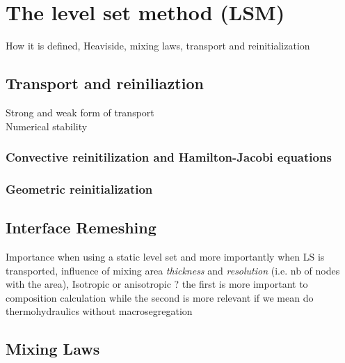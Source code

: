 \section{The level set method (LSM)}
How it is defined, Heaviside, mixing laws, transport and reinitialization

\subsection{Transport and reiniliaztion}
Strong and weak form of transport \\
Numerical stability \\
\subsubsection{Convective reinitilization and Hamilton-Jacobi equations}
\subsubsection{Geometric reinitialization}

\subsection{Interface Remeshing}
Importance when using a static level set and more importantly when LS is transported,
influence of mixing area \emph{thickness} and \emph{resolution} (i.e. nb of nodes with the area),
Isotropic or anisotropic ? the first is more important to composition calculation while the second
is more relevant if we mean do thermohydraulics without macrosegregation

\subsection{Mixing Laws}